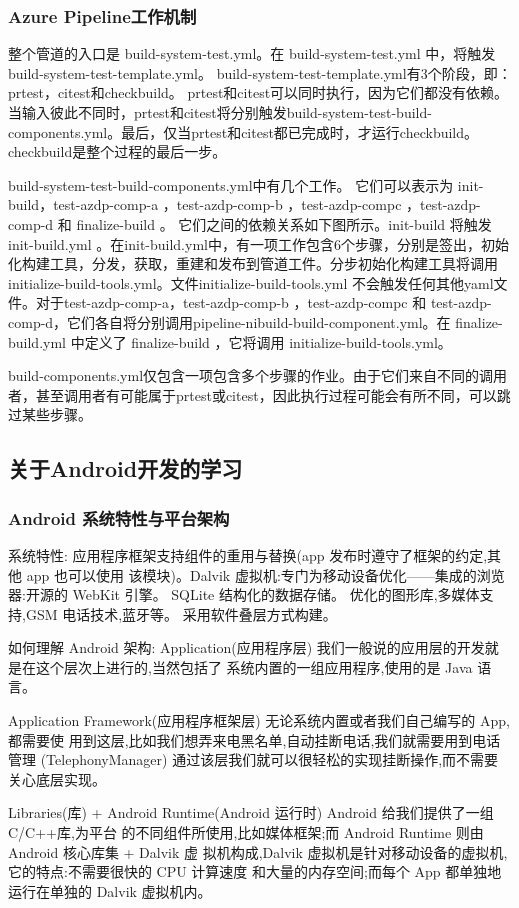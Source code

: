 \documentclass[UTF8]{ctexart}
\begin{document}
\subsubsection{Azure Pipeline工作机制}
整个管道的入口是 build-system-test.yml。在 build-system-test.yml 中，将触发 build-system-test-template.yml。 build-system-test-template.yml有3个阶段，即：prtest，citest和checkbuild。 prtest和citest可以同时执行，因为它们都没有依赖。当输入彼此不同时，prtest和citest将分别触发build-system-test-build-components.yml。最后，仅当prtest和citest都已完成时，才运行checkbuild。 checkbuild是整个过程的最后一步。
\par
build-system-test-build-components.yml中有几个工作。 它们可以表示为 init-build，test-azdp-comp-a ，test-azdp-comp-b ，test-azdp-compc ，test-azdp-comp-d 和 finalize-build 。 它们之间的依赖关系如下图所示。init-build 将触发 init-build.yml 。在init-build.yml中，有一项工作包含6个步骤，分别是签出，初始化构建工具，分发，获取，重建和发布到管道工件。分步初始化构建工具将调用initialize-build-tools.yml。文件initialize-build-tools.yml 不会触发任何其他yaml文件。对于test-azdp-comp-a，test-azdp-comp-b ，test-azdp-compc 和 test-azdp-comp-d，它们各自将分别调用pipeline-nibuild-build-component.yml。在 finalize-build.yml 中定义了 finalize-build ，它将调用 initialize-build-tools.yml。
\par
build-components.yml仅包含一项包含多个步骤的作业。由于它们来自不同的调用者，甚至调用者有可能属于prtest或citest，因此执行过程可能会有所不同，可以跳过某些步骤。
\subsection{关于Android开发的学习}
\subsubsection{Android 系统特性与平台架构}
系统特性: 应用程序框架支持组件的重用与替换(app 发布时遵守了框架的约定,其他 app 也可以使用 该模块)。Dalvik 虚拟机:专门为移动设备优化——集成的浏览器:开源的 WebKit 引擎。 SQLite 结构化的数据存储。 优化的图形库,多媒体支持,GSM 电话技术,蓝牙等。 采用软件叠层方式构建。 
\par
如何理解 Android 架构: Application(应用程序层) 我们一般说的应用层的开发就是在这个层次上进行的,当然包括了 系统内置的一组应用程序,使用的是 Java 语言。 
\par
Application Framework(应用程序框架层) 无论系统内置或者我们自己编写的 App,都需要使 用到这层,比如我们想弄来电黑名单,自动挂断电话,我们就需要用到电话管理 (TelephonyManager) 通过该层我们就可以很轻松的实现挂断操作,而不需要关心底层实现。 
\par
Libraries(库) + Android Runtime(Android 运行时) Android 给我们提供了一组 C/C++库,为平台 的不同组件所使用,比如媒体框架;而 Android Runtime 则由 Android 核心库集 + Dalvik 虚 拟机构成,Dalvik 虚拟机是针对移动设备的虚拟机,它的特点:不需要很快的 CPU 计算速度 和大量的内存空间;而每个 App 都单独地运行在单独的 Dalvik 虚拟机内。
\end{document}
